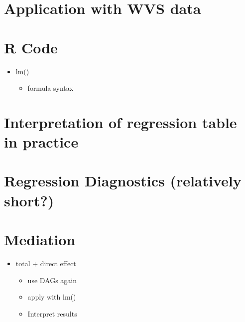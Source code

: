 \documentclass[
]{book}
\providecommand{\tightlist}{%
  \setlength{\itemsep}{0pt}\setlength{\parskip}{0pt}}
\begin{document}
\hypertarget{application-with-wvs-data}{%
\section{Application with WVS data}\label{application-with-wvs-data}}

\hypertarget{r-code}{%
\section{R Code}\label{r-code}}

\begin{itemize}
\tightlist
\item
  lm()

  \begin{itemize}
  \tightlist
  \item
    formula syntax
  \end{itemize}
\end{itemize}

\hypertarget{interpretation-of-regression-table-in-practice}{%
\section{Interpretation of regression table in practice}\label{interpretation-of-regression-table-in-practice}}

\hypertarget{regression-diagnostics-relatively-short}{%
\section{Regression Diagnostics (relatively short?)}\label{regression-diagnostics-relatively-short}}

\hypertarget{mediation}{%
\section{Mediation}\label{mediation}}

\begin{itemize}
\tightlist
\item
  total + direct effect

  \begin{itemize}
  \tightlist
  \item
    use DAGs again
  \item
    apply with lm()
  \item
    Interpret results
  \end{itemize}
\end{itemize}
\end{document}
